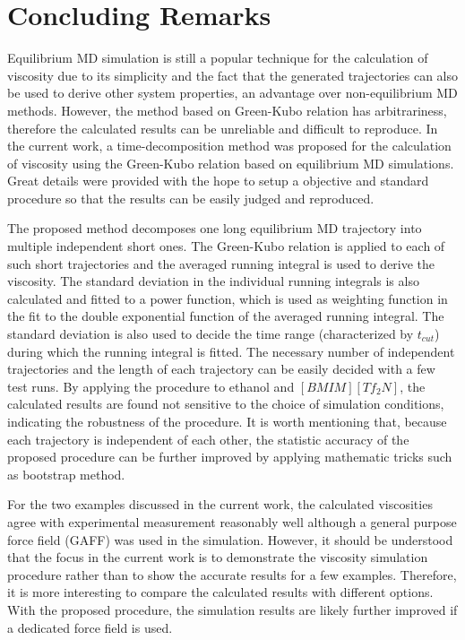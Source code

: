 \documentclass[12pt]{article}
\begin{document}
\section{Concluding Remarks}

Equilibrium MD simulation is still a popular technique 
for the calculation of viscosity due to its simplicity
and the fact that the generated trajectories can also be used to derive other system properties,
an advantage over non-equilibrium MD methods.
However, the method based on Green-Kubo relation has arbitrariness,
therefore the calculated results can be unreliable and difficult to reproduce.
In the current work,
a time-decomposition method was proposed for the calculation of viscosity using the Green-Kubo relation 
based on equilibrium MD simulations.
Great details were provided with the hope to setup a objective and standard procedure
so that the results can be easily judged and reproduced.

The proposed method decomposes one long equilibrium MD trajectory into multiple independent short ones.
The Green-Kubo relation is applied to each of such short trajectories
and the averaged running integral is used to derive the viscosity.
The standard deviation in the individual running integrals is also calculated and fitted to a power function,
which is used as weighting function in the fit to the double exponential function of the averaged running integral.
The standard deviation is also used to decide the time range (characterized by $t_{cut}$) 
during which the running integral is fitted.
The necessary number of independent trajectories and the length of each trajectory can be easily decided with a few test runs.
By applying the procedure to ethanol and $[BMIM][Tf_2N]$,
the calculated results are found not sensitive to the choice of simulation conditions,
indicating the robustness of the procedure.
It is worth mentioning that,
because each trajectory is independent of each other,
the statistic accuracy of the proposed procedure can be further improved 
by applying mathematic tricks such as bootstrap method.
\cite{Bootstrap}

For the two examples discussed in the current work,
the calculated viscosities agree with experimental measurement reasonably well
although a general purpose force field (GAFF) was used in the simulation.
However, it should be understood that the focus in the current work is to demonstrate the viscosity simulation procedure
rather than to show the accurate results for a few examples.
Therefore, it is more interesting to compare the calculated results with different options.
With the proposed procedure,
the simulation results are likely further improved if a dedicated force field is used.
\cite{Andreussi.JCP.137.044508.2012,
Chaban.JPCB.118.10716.2014}
\end{document}
